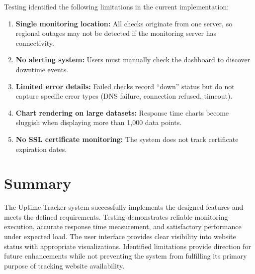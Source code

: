 Testing identified the following limitations in the current implementation:

\begin{enumerate}
    \item \textbf{Single monitoring location:} All checks originate from one server, so regional outages may not be detected if the monitoring server has connectivity.
    
    \item \textbf{No alerting system:} Users must manually check the dashboard to discover downtime events.
    
    \item \textbf{Limited error details:} Failed checks record ``down'' status but do not capture specific error types (DNS failure, connection refused, timeout).
    
    \item \textbf{Chart rendering on large datasets:} Response time charts become sluggish when displaying more than 1,000 data points.
    
    \item \textbf{No SSL certificate monitoring:} The system does not track certificate expiration dates.
\end{enumerate}

\section{Summary}

The Uptime Tracker system successfully implements the designed features and meets the defined requirements. Testing demonstrates reliable monitoring execution, accurate response time measurement, and satisfactory performance under expected load. The user interface provides clear visibility into website status with appropriate visualizations. Identified limitations provide direction for future enhancements while not preventing the system from fulfilling its primary purpose of tracking website availability.